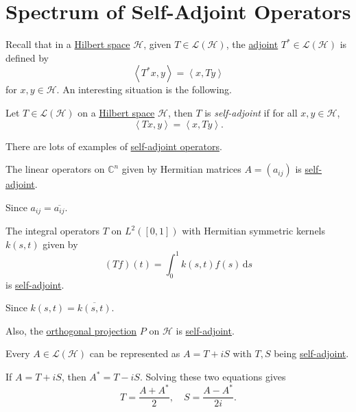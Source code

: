 \section{Spectrum of Self-Adjoint Operators}
Recall that in a \hyperref[def:Hilbert-space]{Hilbert space} \(\mathcal{H} \), given \(T\in \mathcal{L} (\mathcal{H} )\), the \hyperref[def:adjoint-op]{adjoint} \(T^{\ast} \in \mathcal{L} (\mathcal{H} )\) is defined by
\[
	\left\langle T^{\ast} x, y \right\rangle = \left\langle x, Ty \right\rangle
\]
for \(x, y\in \mathcal{H} \). An interesting situation is the following.

\begin{definition}\label{def:self-adjoint-op}
	Let \(T\in \mathcal{L} (\mathcal{H} )\) on a \hyperref[def:Hilbert-space]{Hilbert space} \(\mathcal{H} \), then \(T\) is \emph{self-adjoint} if for all \(x, y\in \mathcal{H} \),
	\[
		\left\langle Tx, y \right\rangle = \left\langle x, Ty \right\rangle.
	\]
\end{definition}

There are lots of examples of \hyperref[def:self-adjoint-op]{self-adjoint operators}.

\begin{eg}
	The linear operators on \(\mathbb{C} ^n\) given by Hermitian matrices \(A = (a_{ij} )\) is \hyperref[def:self-adjoint-op]{self-adjoint}.
\end{eg}
\begin{explanation}
	Since \(a_{ij} = \overline{a_{ij}}\).
\end{explanation}

\begin{eg}
	The integral operators \(T\) on \(L^2([0, 1])\) with Hermitian symmetric kernels \(k(s, t)\) given by
	\[
		(Tf)(t) = \int_{0}^{1} k(s, t)f(s) \,\mathrm{d}s
	\]
	is \hyperref[def:self-adjoint-op]{self-adjoint}.
\end{eg}
\begin{explanation}
	Since \(k(s, t) = \overline{k(s, t)}\).
\end{explanation}

Also, the \hyperref[def:orthogonal-projection]{orthogonal projection} \(P\) on \(\mathcal{H} \) is \hyperref[def:self-adjoint-op]{self-adjoint}.

\begin{remark}
	Every \(A\in \mathcal{L} (\mathcal{H} )\) can be represented as \(A = T+iS\) with \(T, S\) being \hyperref[def:self-adjoint-op]{self-adjoint}.
\end{remark}
\begin{explanation}
	If \(A = T + iS\), then \(A^{\ast} = T - iS\). Solving these two equations gives
	\[
		T = \frac{A + A^{\ast} }{2},\quad S = \frac{A - A^{\ast} }{2i}.
	\]
\end{explanation}

